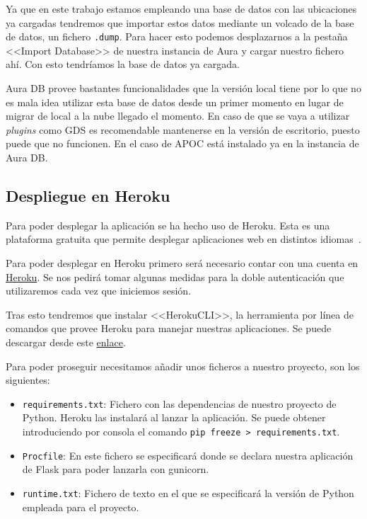 
Ya que en este trabajo estamos empleando una base de datos con las ubicaciones ya cargadas tendremos que importar estos datos mediante un volcado de la base de datos, un fichero \texttt{.dump}. Para hacer esto podemos desplazarnos a la pestaña <<Import Database>> de nuestra instancia de Aura y cargar nuestro fichero ahí. Con esto tendríamos la base de datos ya cargada.


Aura DB provee bastantes funcionalidades que la versión local tiene por lo que no es mala idea utilizar esta base de datos desde un primer momento en lugar de migrar de local a la nube llegado el momento. En caso de que se vaya a utilizar \textit{plugins} como GDS es recomendable mantenerse en la versión de escritorio, puesto puede que no funcionen. En el caso de APOC está instalado ya en la instancia de Aura DB.

\subsection{Despliegue en Heroku}

Para poder desplegar la aplicación se ha hecho uso de Heroku. Esta es una plataforma gratuita que permite desplegar aplicaciones web en distintos idiomas~\cite{herokuCloudApplication}.

Para poder desplegar en Heroku primero será necesario contar con una cuenta en \href{https://signup.heroku.com/}{Heroku}. Se nos pedirá tomar algunas medidas para la doble autenticación que utilizaremos cada vez que iniciemos sesión.

Tras esto tendremos que instalar <<HerokuCLI>>, la herramienta por línea de comandos que provee Heroku para manejar nuestras aplicaciones. Se puede descargar desde este \href{https://devcenter.heroku.com/articles/heroku-cli#install-the-heroku-cli}{enlace}.

Para poder proseguir necesitamos añadir unos ficheros a nuestro proyecto, son los siguientes:
\begin{itemize}
	\item \texttt{requirements.txt}: Fichero con las dependencias de nuestro proyecto de Python. Heroku las instalará al lanzar la aplicación. Se puede obtener introduciendo por consola el comando \texttt{pip freeze > requirements.txt}.
	\item \texttt{Procfile}: En este fichero se especificará donde se declara nuestra aplicación de Flask para poder lanzarla con gunicorn.
	\item \texttt{runtime.txt}: Fichero de texto en el que se especificará la versión de Python empleada para el proyecto.
\end{itemize}

